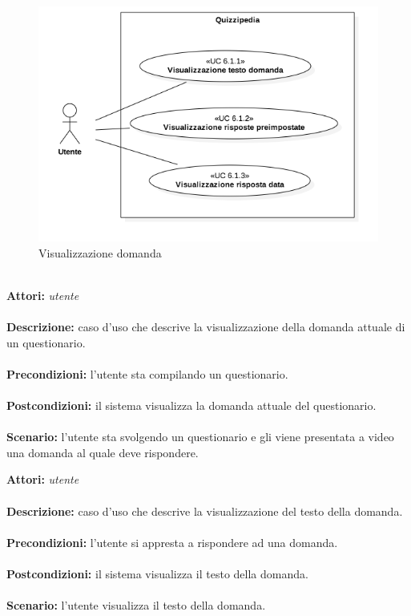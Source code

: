 \documentclass[a4paper,11pt]{article}
\begin{document}
\begin{figure}[h!]
\centering
\includegraphics[scale=0.6]{../immagini/UC6_1.png}
\caption{Visualizzazione domanda}
\end{figure}
\ \\
\textbf{Attori:} \textit{utente}
\\ \\
\textbf{Descrizione:} caso d'uso che descrive la visualizzazione della domanda attuale di un questionario.\\
\\
\textbf{Precondizioni:} l'utente sta compilando un questionario.\\
\\
\textbf{Postcondizioni:} il sistema visualizza la domanda attuale del questionario.\\
\\
\textbf{Scenario:} l’utente sta svolgendo un questionario e gli viene presentata a video una domanda al quale deve rispondere.\\



\textbf{Attori:} \textit{utente}
\\ \\
\textbf{Descrizione:} caso d'uso che descrive la visualizzazione del testo della domanda.\\
\\
\textbf{Precondizioni:} l'utente si appresta a rispondere ad una domanda.\\
\\
\textbf{Postcondizioni:} il sistema visualizza il testo della domanda.\\
\\
\textbf{Scenario:} l’utente visualizza il testo della domanda.\\
\end{document}
